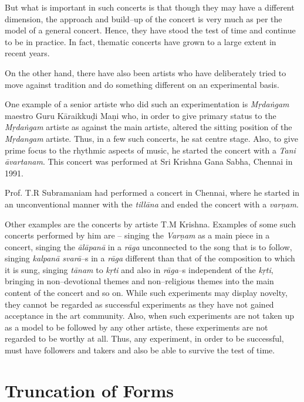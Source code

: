 But what is important in such concerts is that though they may have a different dimension, the approach and build–up of the concert is very much as per the model of a general concert. Hence, they have stood the test of time and continue to be in practice. In fact, thematic concerts have grown to a large extent in recent years.

On the other hand, there have also been artists who have deliberately tried to move against tradition and do something different on an experimental basis.

One example of a senior artiste who did such an experimentation is \textit{Mṛdaṅgam} maestro Guru Kāraikkuḍi Maṇi who, in order to give primary status to the \textit{Mṛdaṅgam} artiste as against the main artiste, altered the sitting position of the \textit{Mṛdangam} artiste. Thus, in a few such concerts, he sat centre stage. Also, to give prime focus to the rhythmic aspects of music, he started the concert with a \textit{Tani āvartanam}. This concert was performed at Sri Krishna Gana Sabha, Chennai in 1991.

Prof. T.R Subramaniam had performed a concert in Chennai, where he started in an unconventional manner with the \textit{tillāna} and ended the concert with a \textit{varṇam}.

Other examples are the concerts by artiste T.M Krishna. Examples of some such concerts performed by him are – singing the \textit{Varṇam} as a main piece in a concert, singing the \textit{ālāpanā} in a \textit{rāga} unconnected to the song that is to follow, singing \textit{kalpanā svarā}–s in a \textit{rāga} different than that of the composition to which it is sung, singing \textit{tānam} to \textit{kṛti} and also in \textit{rāga}–s independent of the \textit{kṛti}, bringing in non–devotional themes and non–religious themes into the main content of the concert and so on. While such experiments may display novelty, they cannot be regarded as successful experiments as they have not gained acceptance in the art community. Also, when such experiments are not taken up as a model to be followed by any other artiste, these experiments are not regarded to be worthy at all. Thus, any experiment, in order to be successful, must have followers and takers and also be able to survive the test of time.


\section*{Truncation of Forms}

